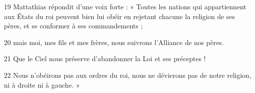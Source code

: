 
19 Mattathias répondit d’une voix forte : « Toutes les nations qui appartiennent aux États du roi peuvent bien lui obéir en rejetant chacune la religion de ses pères, et se conformer à ses commandements ;

20 mais moi, mes fils et mes frères, nous suivrons l’Alliance de nos pères.

21 Que le Ciel nous préserve d’abandonner la Loi et ses préceptes !

22 Nous n’obéirons pas aux ordres du roi, nous ne dévierons pas de notre religion, ni à droite ni à gauche. »
